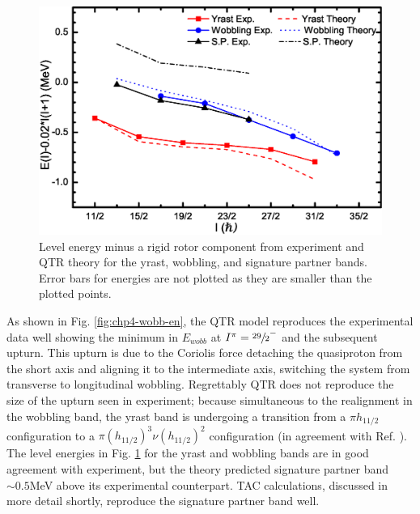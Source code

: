 \begin{figure}[b!]
\centerline{\includegraphics[width=\textwidth]{./img/c4/en_minus_rotor.eps}}
	\caption{Level energy minus a rigid rotor component from experiment and QTR theory for the yrast, wobbling, and signature partner bands. Error bars for energies are not plotted as they are smaller than the plotted points.\label{fig:chp4-qtr-en-minus-rotor}}
\end{figure}

As shown in Fig. \ref{fig:chp4-wobb-en}, the QTR model reproduces the experimental data well showing the minimum in $E_{wobb}$ at $I^{\pi}=\sfrac{29}{2}^-$ and the subsequent upturn. This upturn is due to the Coriolis force detaching the quasiproton from the short axis and aligning it to the intermediate axis, switching the system from transverse to longitudinal wobbling. Regrettably QTR does not reproduce the size of the upturn seen in experiment; because simultaneous to the realignment in the wobbling band, the yrast band is undergoing a transition from a $\pi{}h_{11/2}$ configuration to a $\pi(h_{11/2})^3\nu(h_{11/2})^2$ configuration (in agreement with Ref. \cite{ePaul135Pr}). The level energies in Fig. \ref{fig:chp4-qtr-en-minus-rotor} for the yrast and wobbling bands are in good agreement with experiment, but the theory predicted signature partner band $\sim0.5$MeV above its experimental counterpart. TAC calculations, discussed in more detail shortly, reproduce the signature partner band well.

